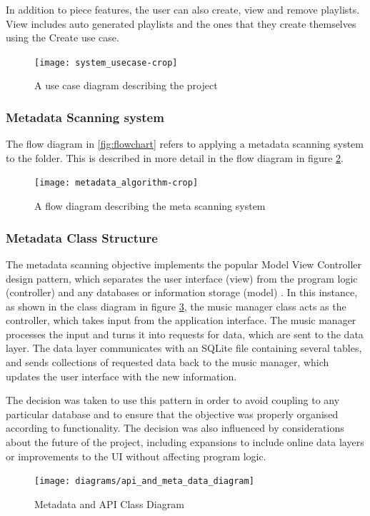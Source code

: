 In addition to piece features, the user can also create, view and remove playlists. View includes auto generated playlists and the ones that they create themselves using the Create use case.
\begin{figure}[h]
    \centering
    \texttt{[image: system\_usecase-crop]}
    \caption{A use case diagram describing the project}
    \label{fig:usecase}
\end{figure}
\subsubsection{Metadata Scanning system}
The flow diagram in \ref{fig:flowchart} refers to applying a metadata scanning system to the folder. This is described in more detail in the flow diagram in figure \ref{fig:meta}. 
\begin{figure}[H]
    \centering
    \texttt{[image: metadata\_algorithm-crop]}
    \caption{A flow diagram describing the meta scanning system}
    \label{fig:meta}
\end{figure}
\subsubsection{Metadata Class Structure}
The metadata scanning objective implements the popular Model View Controller design pattern, which separates the user interface (view) from the program logic (controller) and any databases or information storage (model) \parencite{mvc}.
In this instance, as shown in the class diagram in figure \ref{fig:metadiagram}, the music manager class acts as the controller, which takes input from the application interface. The music manager processes the input and turns it into requests for data, which are sent to the data layer. The data layer communicates with an SQLite file containing several tables, and sends collections of requested data back to the music manager, which updates the user interface with the new information.

The decision was taken to use this pattern in order to avoid coupling to any particular database and to ensure that the objective was properly organised according to functionality. The decision was also influenced by considerations about the future of the project, including expansions to include online data layers or improvements to the UI without affecting program logic.

\begin{figure}[H]
    \centering
    \texttt{[image: diagrams/api\_and\_meta\_data\_diagram]}
    \caption{Metadata and API Class Diagram}
    \label{fig:metadiagram}
\end{figure}

